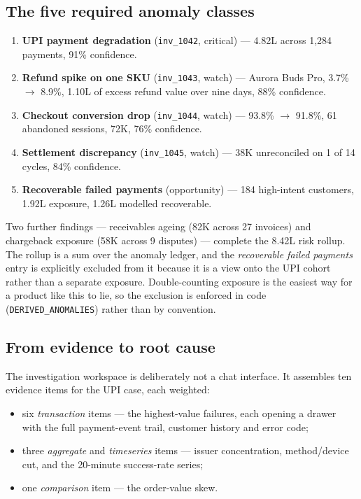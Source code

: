 \documentclass[10pt,twocolumn,a4paper]{article}
\newcommand{\rs}{\rupee}%
\newcommand{\rs}{\textrm{INR}\,}%
\newcommand{\code}[1]{\texttt{\small #1}}
\begin{document}
\subsection{The five required anomaly classes}

\begin{enumerate}
  \item \textbf{UPI payment degradation} (\code{inv\_1042}, critical) ---
    \rs{}4.82L across 1{,}284 payments, 91\% confidence.
  \item \textbf{Refund spike on one SKU} (\code{inv\_1043}, watch) --- Aurora
    Buds Pro, 3.7\% $\rightarrow$ 8.9\%, \rs{}1.10L of excess refund value over
    nine days, 88\% confidence.
  \item \textbf{Checkout conversion drop} (\code{inv\_1044}, watch) --- 93.8\%
    $\rightarrow$ 91.8\%, 61 abandoned sessions, \rs{}72K, 76\% confidence.
  \item \textbf{Settlement discrepancy} (\code{inv\_1045}, watch) --- \rs{}38K
    unreconciled on 1 of 14 cycles, 84\% confidence.
  \item \textbf{Recoverable failed payments} (opportunity) --- 184 high-intent
    customers, \rs{}1.92L exposure, \rs{}1.26L modelled recoverable.
\end{enumerate}

Two further findings --- receivables ageing (\rs{}82K across 27 invoices) and
chargeback exposure (\rs{}58K across 9 disputes) --- complete the \rs{}8.42L
risk rollup. The rollup is a sum over the anomaly ledger, and the
\emph{recoverable failed payments} entry is explicitly excluded from it because
it is a view onto the UPI cohort rather than a separate exposure. Double-counting
exposure is the easiest way for a product like this to lie, so the exclusion is
enforced in code (\code{DERIVED\_ANOMALIES}) rather than by convention.

\subsection{From evidence to root cause}

The investigation workspace is deliberately not a chat interface. It assembles
ten evidence items for the UPI case, each weighted:

\begin{itemize}
  \item six \emph{transaction} items --- the highest-value failures, each opening
    a drawer with the full payment-event trail, customer history and error code;
  \item three \emph{aggregate} and \emph{timeseries} items --- issuer
    concentration, method/device cut, and the 20-minute success-rate series;
  \item one \emph{comparison} item --- the order-value skew.
\end{itemize}
\end{document}
